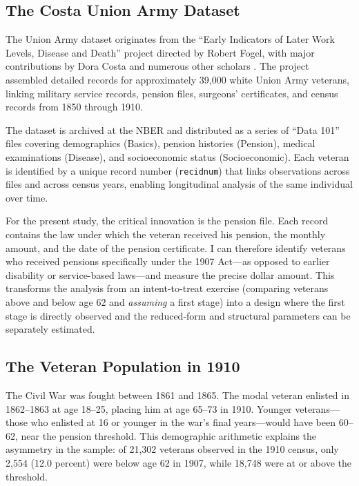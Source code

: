 \documentclass[12pt]{article}
\begin{document}
\subsection{The Costa Union Army Dataset}

The Union Army dataset originates from the ``Early Indicators of Later Work Levels, Disease and Death'' project directed by Robert Fogel, with major contributions by Dora Costa and numerous other scholars \citep{fogel1993new}. The project assembled detailed records for approximately 39,000 white Union Army veterans, linking military service records, pension files, surgeons' certificates, and census records from 1850 through 1910.

The dataset is archived at the NBER and distributed as a series of ``Data 101'' files covering demographics (Basics), pension histories (Pension), medical examinations (Disease), and socioeconomic status (Socioeconomic). Each veteran is identified by a unique record number (\texttt{recidnum}) that links observations across files and across census years, enabling longitudinal analysis of the same individual over time.

For the present study, the critical innovation is the pension file. Each record contains the law under which the veteran received his pension, the monthly amount, and the date of the pension certificate. I can therefore identify veterans who received pensions specifically under the 1907 Act---as opposed to earlier disability or service-based laws---and measure the precise dollar amount. This transforms the analysis from an intent-to-treat exercise (comparing veterans above and below age 62 and \textit{assuming} a first stage) into a design where the first stage is directly observed and the reduced-form and structural parameters can be separately estimated.

\subsection{The Veteran Population in 1910}

The Civil War was fought between 1861 and 1865. The modal veteran enlisted in 1862--1863 at age 18--25, placing him at age 65--73 in 1910. Younger veterans---those who enlisted at 16 or younger in the war's final years---would have been 60--62, near the pension threshold. This demographic arithmetic explains the asymmetry in the sample: of 21,302 veterans observed in the 1910 census, only 2,554 (12.0 percent) were below age 62 in 1907, while 18,748 were at or above the threshold.
\end{document}
